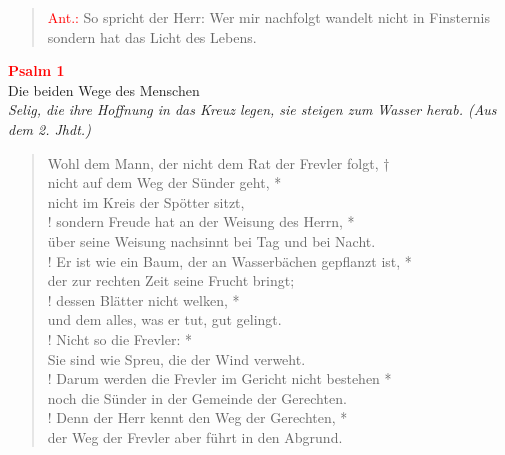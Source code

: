 \vspace*{3.3cm}

\begin{verse}
\textcolor{red}{Ant.:} So spricht der Herr: Wer mir nachfolgt wandelt nicht in Finsternis sondern hat das Licht des Lebens.
\end{verse}

\vspace*{0.7cm}


\begin{center}
 \textcolor{red}{\large \bf Psalm 1}\\
Die beiden Wege des Menschen\\
\textit{\small Selig, die ihre Hoffnung in das Kreuz legen, sie steigen zum Wasser herab. (Aus dem 2. Jhdt.)}
\end{center}
\begin{verse}
Wohl dem Mann, der nicht dem Rat der Frevler folgt, †\\
nicht auf dem Weg der Sünder geht, *\\
nicht im Kreis der Spötter sitzt,\\!
\vin  sondern Freude hat an der Weisung des Herrn, *\\ 
\vin  über seine Weisung nachsinnt bei Tag und bei Nacht.\\!
Er ist wie ein Baum, der an Wasserbächen gepflanzt ist, *\\
der zur rechten Zeit seine Frucht bringt; \\! 
\vin  dessen Blätter nicht welken, *\\ 
\vin  und dem alles, was er tut, gut gelingt.\\! 
Nicht so die Frevler: *\\
Sie sind wie Spreu, die der Wind verweht.\\! \pagebreak
\vin  Darum werden die Frevler im Gericht nicht bestehen *\\
\vin  noch die Sünder in der Gemeinde der Gerechten.\\!
Denn der Herr kennt den Weg der Gerechten, *\\ 
der Weg der Frevler aber führt in den Abgrund.
\end{verse}
\vspace{1cm}



